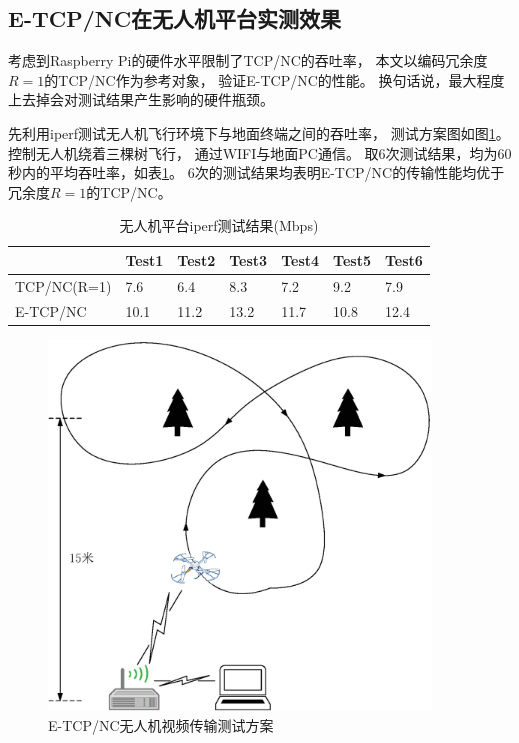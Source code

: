 \subsection{E-TCP/NC在无人机平台实测效果}
考虑到Raspberry Pi的硬件水平限制了TCP/NC的吞吐率，
本文以编码冗余度$R=1$的TCP/NC作为参考对象，
验证E-TCP/NC的性能。
换句话说，最大程度上去掉会对测试结果产生影响的硬件瓶颈。
\par
先利用iperf测试无人机飞行环境下与地面终端之间的吞吐率，
测试方案图如图\ref{fig:uav}。
控制无人机绕着三棵树飞行，
通过WIFI与地面PC通信。
取6次测试结果，均为60秒内的平均吞吐率，如表\ref{tab:uav}。
6次的测试结果均表明E-TCP/NC的传输性能均优于冗余度$R=1$的TCP/NC。
\begin{table}[htp]
	\centering
	\caption{无人机平台iperf测试结果(Mbps)}
	\label{tab:uav}
	\begin{tabular}{lllllll}
		\toprule
		 &Test1&Test2&Test3&Test4&Test5&Test6\tabularnewline
		\midrule
		TCP/NC(R=1)		&7.6&6.4&8.3&7.2&9.2&7.9\tabularnewline
		E-TCP/NC		&10.1&11.2&13.2&11.7&10.8&12.4\tabularnewline
		\bottomrule
	\end{tabular}
\end{table}
\begin{figure}[htbp]
	\centering
	\includegraphics[width=4in]{figures/ceshiluxian.eps}
	\caption{E-TCP/NC无人机视频传输测试方案}
	\label{fig:uav}
\end{figure}

